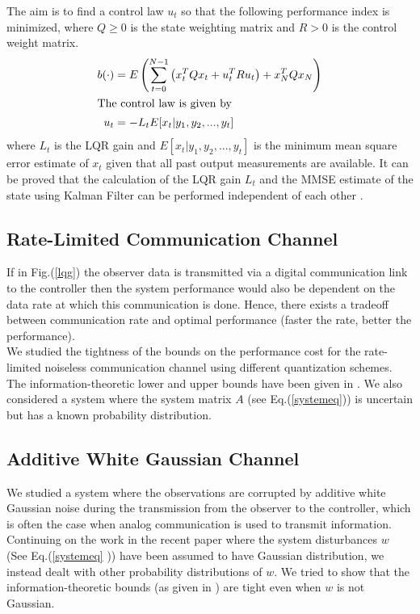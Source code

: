 \documentclass[12pt]{caltech_thesis_finalreport}
\begin{document}
	The aim is to find a control law $u_{t}$ so that the following performance index is minimized, where $Q \geq 0$ is the state weighting matrix and $R > 0$ is the control weight matrix. 
	\begin{align}
		b(\cdot)&=E\left(\sum\limits_{t=0}^{N-1} \left(x_{t}^{T}Qx_{t} + u_{t}^{T}Ru_{t}\right) + x_{N}^{T}Qx_{N} \right)\\
	\intertext{The control law is given by}
	\label{controleq}
	u_{t}&=-L_{t}E[x_{t}|y_{1},y_{2},...,y_{t}]
	\end{align}
	 where $L_{t}$ is the LQR gain and $E[x_{t}|y_{1},y_{2},...,y_{t}]$ is the minimum mean square error estimate of $x_{t}$ given that all past output measurements are available. It can be proved that the calculation of the LQR gain $L_{t}$ and the MMSE estimate of the state using Kalman Filter can be performed independent of each other \cite{book}. 
	\subsection{Rate-Limited Communication Channel}
	If in Fig.(\ref{lqg}) the observer data is transmitted via a digital communication link to the controller then the system performance would also be dependent on the data rate at which this communication is done. Hence, there exists a tradeoff between communication rate and optimal performance (faster the rate, better the performance). \\We studied the tightness of the bounds on the performance cost for the rate-limited noiseless communication channel using different quantization schemes. The information-theoretic lower and upper bounds have been given in \cite{victoria}. We also considered a system where the system matrix $A$ (see Eq.(\ref{systemeq})) is uncertain but has a known probability distribution. 
	\subsection{Additive White Gaussian Channel}
We studied a system where the observations are corrupted by additive white Gaussian noise during the transmission from the observer to the controller, which is often the case when analog communication is used to transmit information.
Continuing on the work in the recent paper \cite{anatoly} where the system disturbances $w$ (See Eq.(\ref{systemeq} )) have been assumed to have Gaussian distribution, we instead dealt with other probability distributions of $w$. We tried to show that the information-theoretic bounds (as given in \cite{victoria}) are tight even when $w$ is not Gaussian.
\end{document}
